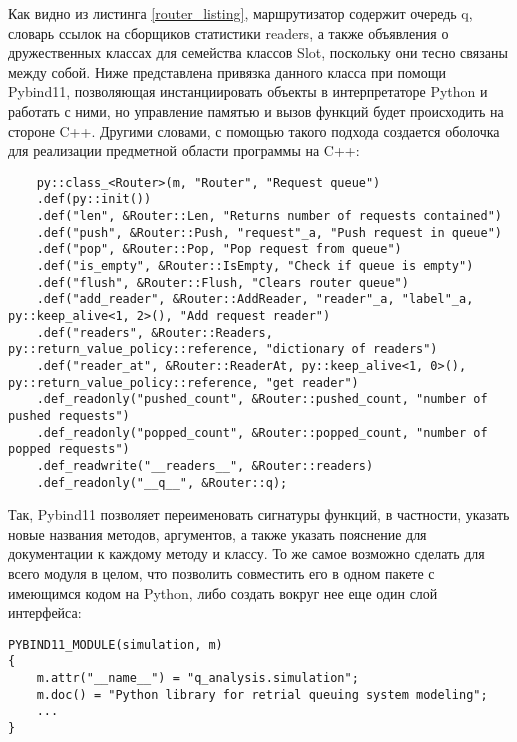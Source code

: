 Как видно из листинга \ref{router_listing}, маршрутизатор содержит очередь q, словарь ссылок на сборщиков статистики readers, а также объявления о дружественных классах для семейства классов Slot, поскольку они тесно связаны между собой. Ниже представлена привязка данного класса при помощи Pybind11, позволяющая инстанциировать объекты в интерпретаторе Python и работать с ними, но управление памятью и вызов функций будет происходить на стороне C++. Другими словами, с помощью такого подхода создается оболочка для реализации предметной области программы на C++:

\begin{lstlisting}
	py::class_<Router>(m, "Router", "Request queue")
	.def(py::init())
	.def("len", &Router::Len, "Returns number of requests contained")
	.def("push", &Router::Push, "request"_a, "Push request in queue")
	.def("pop", &Router::Pop, "Pop request from queue")
	.def("is_empty", &Router::IsEmpty, "Check if queue is empty")
	.def("flush", &Router::Flush, "Clears router queue")
	.def("add_reader", &Router::AddReader, "reader"_a, "label"_a, py::keep_alive<1, 2>(), "Add request reader")
	.def("readers", &Router::Readers, py::return_value_policy::reference, "dictionary of readers")
	.def("reader_at", &Router::ReaderAt, py::keep_alive<1, 0>(), py::return_value_policy::reference, "get reader")
	.def_readonly("pushed_count", &Router::pushed_count, "number of pushed requests")
	.def_readonly("popped_count", &Router::popped_count, "number of popped requests")
	.def_readwrite("__readers__", &Router::readers)
	.def_readonly("__q__", &Router::q);
\end{lstlisting}

Так, Pybind11 позволяет переименовать сигнатуры функций, в частности, указать новые названия методов, аргументов, а также указать пояснение для документации к каждому методу и классу. То же самое возможно сделать для всего модуля в целом, что позволить совместить его в одном пакете с имеющимся кодом на Python, либо создать вокруг нее еще один слой интерфейса:
\begin{lstlisting}
PYBIND11_MODULE(simulation, m)
{
	m.attr("__name__") = "q_analysis.simulation";
	m.doc() = "Python library for retrial queuing system modeling";
	...
}
\end{lstlisting}

